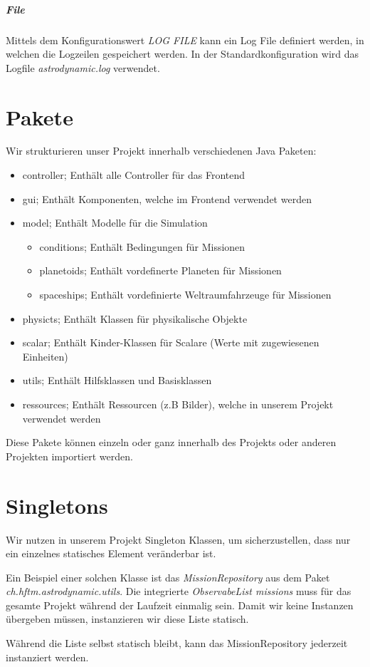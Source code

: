 \subparagraph{File}

Mittels dem Konfigurationswert \textit{LOG FILE} kann ein Log File definiert werden, in welchen die Logzeilen gespeichert werden.
In der Standardkonfiguration wird das Logfile \textit{astrodynamic.log} verwendet.

\section{Pakete}

Wir strukturieren unser Projekt innerhalb verschiedenen Java Paketen:

\begin{itemize}
	\item controller; Enthält alle Controller für das Frontend
	\item gui; Enthält Komponenten, welche im Frontend verwendet werden
	\item model; Enthält Modelle für die Simulation
	\begin{itemize}
		\item conditions; Enthält Bedingungen für Missionen
		\item planetoids; Enthält vordefinerte Planeten für Missionen
		\item spaceships; Enthält vordefinierte Weltraumfahrzeuge für Missionen
	\end{itemize}
	\item physicts; Enthält Klassen für physikalische Objekte
	\item scalar; Enthält Kinder-Klassen für Scalare (Werte mit zugewiesenen Einheiten)
	\item utils; Enthält Hilfsklassen und Basisklassen
	\item ressources; Enthält Ressourcen (z.B Bilder), welche in unserem Projekt verwendet werden 
\end{itemize}

Diese Pakete können einzeln oder ganz innerhalb des Projekts oder anderen Projekten importiert werden.

\section{Singletons}

Wir nutzen in unserem Projekt Singleton Klassen, um sicherzustellen, dass nur ein einzelnes statisches Element veränderbar ist.

Ein Beispiel einer solchen Klasse ist das \textit{MissionRepository} aus dem Paket \textit{ch.hftm.astrodynamic.utils}.
Die integrierte \textit{ObservabeList missions} muss für das gesamte Projekt während der Laufzeit einmalig sein. Damit wir keine Instanzen übergeben müssen, instanzieren wir diese Liste statisch.

Während die Liste selbst statisch bleibt, kann das MissionRepository jederzeit instanziert werden.
